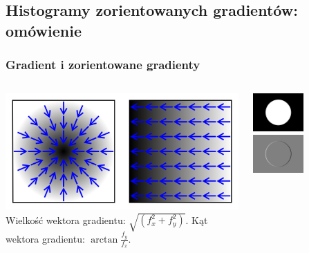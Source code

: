 \documentclass{beamer}
\begin{document}
        \subsection{Histogramy zorientowanych gradientów: omówienie}
            \begin{frame}
                \frametitle{Gradient i zorientowane gradienty}
                \begin{columns}
                    \begin{column}{0.5\textwidth}
                        \begin{center}
                            \includegraphics[width=1\textwidth]{pictures/gradient.png}
                            Wielkość wektora gradientu: $\sqrt{\left( f^{2}_{x}+f^{2}_{y}\right)}$.
                            \newline
                            Kąt wektora gradientu: $\arctan{\frac{f_{y}}{f_{x}}}$.
                        \end{center}
                    \end{column}
                    \begin{column}{0.5\textwidth}
                        \begin{center}
                            \includegraphics[width=0.5\textwidth]{pictures/circle.png}
                            \includegraphics[width=0.5\textwidth]{pictures/gradient_x.png}

\end{center}
\end{column}
\end{columns}
\end{frame}
\end{document}
